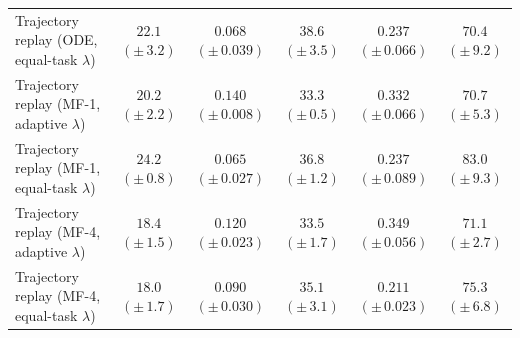 \begin{table}[t]
{\begin{tabular}{@{}lccccc@{}}
\rowcolor{trajectoryrow} Trajectory replay (ODE, equal-task $\lambda$) & $22.1$ {\scriptsize $(\pm\,3.2)$} & $0.068$ {\scriptsize $(\pm\,0.039)$} & $38.6$ {\scriptsize $(\pm\,3.5)$} & $0.237$ {\scriptsize $(\pm\,0.066)$} & $70.4$ {\scriptsize $(\pm\,9.2)$} \\
\rowcolor{trajectoryrow} Trajectory replay (MF-1, adaptive $\lambda$) & $20.2$ {\scriptsize $(\pm\,2.2)$} & $0.140$ {\scriptsize $(\pm\,0.008)$} & $33.3$ {\scriptsize $(\pm\,0.5)$} & $0.332$ {\scriptsize $(\pm\,0.066)$} & $70.7$ {\scriptsize $(\pm\,5.3)$} \\
\rowcolor{trajectoryrow} Trajectory replay (MF-1, equal-task $\lambda$) & $24.2$ {\scriptsize $(\pm\,0.8)$} & $0.065$ {\scriptsize $(\pm\,0.027)$} & $36.8$ {\scriptsize $(\pm\,1.2)$} & $0.237$ {\scriptsize $(\pm\,0.089)$} & $83.0$ {\scriptsize $(\pm\,9.3)$} \\
\rowcolor{trajectoryrow} Trajectory replay (MF-4, adaptive $\lambda$) & $18.4$ {\scriptsize $(\pm\,1.5)$} & $0.120$ {\scriptsize $(\pm\,0.023)$} & $33.5$ {\scriptsize $(\pm\,1.7)$} & $0.349$ {\scriptsize $(\pm\,0.056)$} & $71.1$ {\scriptsize $(\pm\,2.7)$} \\
\rowcolor{trajectoryrow} Trajectory replay (MF-4, equal-task $\lambda$) & $18.0$ {\scriptsize $(\pm\,1.7)$} & $0.090$ {\scriptsize $(\pm\,0.030)$} & $35.1$ {\scriptsize $(\pm\,3.1)$} & $0.211$ {\scriptsize $(\pm\,0.023)$} & $75.3$ {\scriptsize $(\pm\,6.8)$} \\
\bottomrule
\end{tabular}%
}
\end{table}
